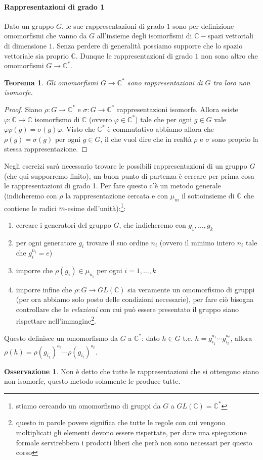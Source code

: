 \documentclass[11pt]{article}
\theoremstyle{plain}
\newtheorem{thm}{Teorema}[section]
\theoremstyle{definition}
\newtheorem*{rem}{Osservazione}
\theoremstyle{remark}
\newcommand{\C}{\mathbb{C}}
\begin{document}
\paragraph{Rappresentazioni di grado 1}\label{par:rappr_deg_1}
Dato un gruppo $G$, le sue rappresentazioni di grado $1$ sono per definizione
omomorfismi che vanno da $G$ all'insieme degli isomorfismi di $\C-$spazi vettoriali di dimensione $1$.
Senza perdere di generalità possiamo supporre che lo spazio vettoriale sia proprio $\C$. Dunque le
rappresentazioni di grado $1$ non sono altro che omomorfismi $G\to\C^*$.
\begin{thm}
Gli omomorfismi $G\to\C^*$ sono rappresentazioni di $G$ tra loro non isomorfe.
\end{thm}
\begin{proof}
Siano $\rho:G\to\C^*$ e $\sigma:G\to\C^*$ rappresentazioni isomorfe. Allora
esiste $\varphi:\C\to\C$ isomorfismo di $\C$ (ovvero $\varphi\in\C^*$) tale che per ogni $g\in G$ vale $\varphi \rho(g) = \sigma(g) \varphi$.
Visto che $\C^*$ è commutativo abbiamo allora che $\rho(g) = \sigma(g)$ per ogni $g\in G$, il che vuol dire che 
in realtà $\rho$ e $\sigma$ sono proprio la stessa rappresentazione.
\end{proof}

Negli esercizi sarà necessario trovare le possibili rappresentazioni di un gruppo $G$ (che qui supporremo finito), un buon punto di partenza è cercare per prima cosa le rappresentazioni di grado 1. Per fare questo c'è un metodo generale (indicheremo con $\rho$ la rappresentazione cercata e con $\mu_m$ il sottoinsieme di $\C$ che contiene le radici $m$-esime dell'unità):\footnote{stiamo cercando un omomorfismo di gruppi da $G$ a $GL(\C)=\C^*$}:
\begin{enumerate}
	\item cercare i generatori del gruppo $G$, che indicheremo con $g_1, \ldots, g_k$
	\item per ogni generatore $g_i$ trovare il suo ordine $n_i$ (ovvero il minimo intero $n_i$ tale che $g_i^{n_i}=e$)
	\item imporre che $\rho(g_i)\in \mu_{n_i}$ per ogni $i=1,\ldots,k$
	\item imporre infine che $\rho:G\to GL(\C)$ sia veramente un omomorfismo di gruppi (per ora abbiamo solo posto delle condizioni necessarie), per fare ciò bisogna controllare che le \textit{relazioni} con cui può essere presentato il gruppo siano rispettare nell'immagine\footnote{questo in parole povere significa che tutte le regole con cui vengono moltiplicati gli elementi devono essere rispettate, per dare una spiegazione formale servirebbero i prodotti liberi che però non sono necessari per questo corso}.
\end{enumerate}
Questo definisce un omomorfismo da $G$ a $\C^*$: dato $h\in G$ t.c. $h=g_{i_1}^{a_1}\cdots g_{i_t}^{a_t}$, allora $\rho(h) = \rho(g_{i_1})^{a_1}\cdots \rho(g_{i_t})^{a_t}$.
\begin{rem}
	Non è detto che tutte le rappresentazioni che si ottengono siano non isomorfe, questo metodo solamente le produce tutte.
\end{rem}
\end{document}
